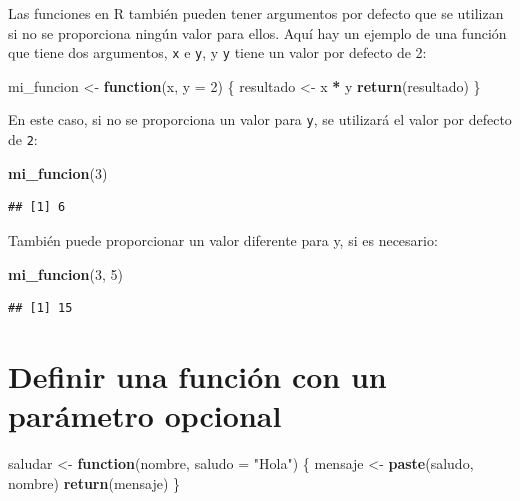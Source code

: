 \documentclass[
]{book}
\newenvironment{Shaded}{\begin{snugshade}}{\end{snugshade}}
\newcommand{\AttributeTok}[1]{\textcolor[rgb]{0.13,0.29,0.53}{#1}}
\newcommand{\ControlFlowTok}[1]{\textcolor[rgb]{0.13,0.29,0.53}{\textbf{#1}}}
\newcommand{\DecValTok}[1]{\textcolor[rgb]{0.00,0.00,0.81}{#1}}
\newcommand{\FunctionTok}[1]{\textcolor[rgb]{0.13,0.29,0.53}{\textbf{#1}}}
\newcommand{\NormalTok}[1]{#1}
\newcommand{\OtherTok}[1]{\textcolor[rgb]{0.56,0.35,0.01}{#1}}
\newcommand{\SpecialCharTok}[1]{\textcolor[rgb]{0.81,0.36,0.00}{\textbf{#1}}}
\newcommand{\StringTok}[1]{\textcolor[rgb]{0.31,0.60,0.02}{#1}}
\begin{document}
Las funciones en R también pueden tener argumentos por defecto que se utilizan si no se proporciona ningún valor para ellos. Aquí hay un ejemplo de una función que tiene dos argumentos, \texttt{x} e \texttt{y}, y \texttt{y} tiene un valor por defecto de 2:

\begin{Shaded}
\begin{Highlighting}[]
\NormalTok{mi\_funcion }\OtherTok{\textless{}{-}} \ControlFlowTok{function}\NormalTok{(x, }\AttributeTok{y =} \DecValTok{2}\NormalTok{) \{}
\NormalTok{  resultado }\OtherTok{\textless{}{-}}\NormalTok{ x }\SpecialCharTok{*}\NormalTok{ y}
  \FunctionTok{return}\NormalTok{(resultado)}
\NormalTok{\}}
\end{Highlighting}
\end{Shaded}

En este caso, si no se proporciona un valor para \texttt{y}, se utilizará el valor por defecto de \texttt{2}:

\begin{Shaded}
\begin{Highlighting}[]
\FunctionTok{mi\_funcion}\NormalTok{(}\DecValTok{3}\NormalTok{)}
\end{Highlighting}
\end{Shaded}

\begin{verbatim}
## [1] 6
\end{verbatim}

También puede proporcionar un valor diferente para y, si es necesario:

\begin{Shaded}
\begin{Highlighting}[]
\FunctionTok{mi\_funcion}\NormalTok{(}\DecValTok{3}\NormalTok{, }\DecValTok{5}\NormalTok{)}
\end{Highlighting}
\end{Shaded}

\begin{verbatim}
## [1] 15
\end{verbatim}

\hypertarget{definir-una-funciuxf3n-con-un-paruxe1metro-opcional}{%
\section{Definir una función con un parámetro opcional}\label{definir-una-funciuxf3n-con-un-paruxe1metro-opcional}}

\begin{Shaded}
\begin{Highlighting}[]
\NormalTok{saludar }\OtherTok{\textless{}{-}} \ControlFlowTok{function}\NormalTok{(nombre, }\AttributeTok{saludo =} \StringTok{"Hola"}\NormalTok{) \{}
\NormalTok{  mensaje }\OtherTok{\textless{}{-}} \FunctionTok{paste}\NormalTok{(saludo, nombre)}
  \FunctionTok{return}\NormalTok{(mensaje)}
\NormalTok{\}}
\end{Highlighting}
\end{Shaded}
\end{document}
